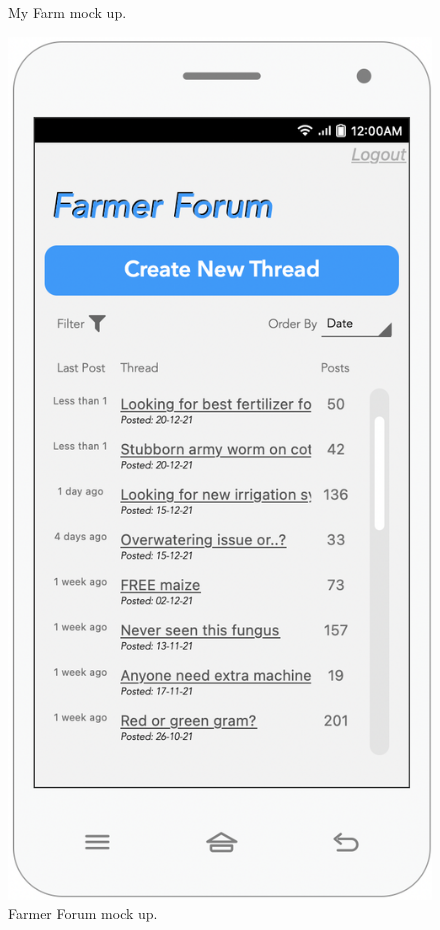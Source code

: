 \begin{multicols}{2}
\begin{figure}[H]
\caption{\label{fig:mock_farm}My Farm mock up.}
\end{figure}

\begin{figure}[H]
\centering
\includegraphics[scale=0.5]{../images_diagrams/mock_ups/farmerforum100.png}
\caption{\label{fig:mock_forum}Farmer Forum mock up.}
\end{figure}
\end{multicols}
\newpage 

